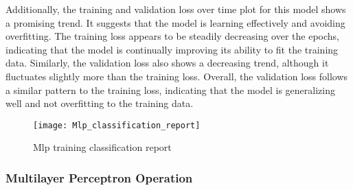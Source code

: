 \documentclass[
	article, %
	11pt, %
	draft, %
]{CSUniSchoolLabReport}
\begin{document}
Additionally, the training and validation loss over time plot for this model shows a promising trend. It suggests that the model is learning effectively and avoiding overfitting. The training loss appears to be steadily decreasing over the epochs, indicating that the model is continually improving its ability to fit the training data. Similarly, the validation loss also shows a decreasing trend, although it fluctuates slightly more than the training loss. Overall, the validation loss follows a similar pattern to the training loss, indicating that the model is generalizing well and not overfitting to the training data.

\begin{figure}[H] 
	\centering
	\texttt{[image: Mlp\_classification\_report]}
	\caption{Mlp training classification report}\label{fig:mlp_classification_report}
\end{figure}


\subsubsection{Multilayer Perceptron Operation}

\end{document}
